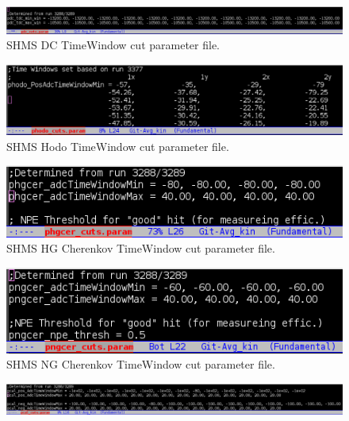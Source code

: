\documentclass[14pt]{article}
\begin{document}
\begin{appendices}
\begin{figure}[H]
  \captionsetup{justification=raggedright,singlelinecheck=false}
  \includegraphics[scale=0.4]{plots/pdc_parm_cut.png}
  \caption{SHMS DC TimeWindow cut parameter file.}
  \label{fig:shms_dc_parm_cut}
\end{figure}
\begin{figure}[H]
  \captionsetup{justification=raggedright,singlelinecheck=false}
  \includegraphics[scale=0.4]{plots/phodo_parm_cut.png}
  \caption{SHMS Hodo TimeWindow cut parameter file.}
  \label{fig:shms_hod_parm_cut}
\end{figure}
\begin{figure}[H]
  \captionsetup{justification=raggedright,singlelinecheck=false}
  \includegraphics[scale=0.4]{plots/phgcer_parm_cut.png}
  \caption{SHMS HG Cherenkov TimeWindow cut parameter file.}
  \label{fig:shms_hgcer_parm_cut}
\end{figure}
\begin{figure}[H]
  \captionsetup{justification=raggedright,singlelinecheck=false}
  \includegraphics[scale=0.4]{plots/pngcer_parm_cut.png}
  \caption{SHMS NG Cherenkov TimeWindow cut parameter file.}
  \label{fig:shms_ngcer_parm_cut}
\end{figure}
\begin{figure}[H]
  \captionsetup{justification=raggedright,singlelinecheck=false}
  \includegraphics[scale=0.4]{plots/pprsh_parm_cut.png}

\end{figure}
\end{appendices}
\end{document}
